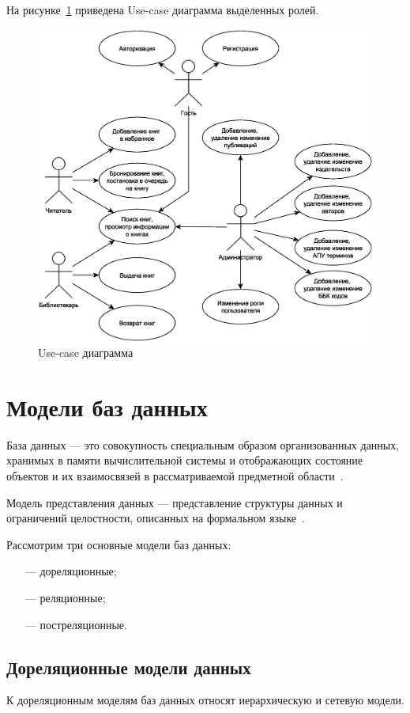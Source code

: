 На рисунке~\ref{fig:use-case} приведена Use-case диаграмма выделенных ролей.
\begin{figure}[H]
	\centering
	\includegraphics[scale=0.6]{img/use-case.eps}
	\caption{Use-case диаграмма}
	\label{fig:use-case}
\end{figure}

\section{Модели баз данных}
База данных --- это совокупность специальным образом организованных данных, хранимых в памяти вычислительной системы и отображающих состояние объектов и их взаимосвязей в рассматриваемой предметной области~\cite{DB}.

Модель представления данных --- представление структуры данных и ограничений целостности, описанных на формальном языке~\cite{Data_model}.

Рассмотрим три основные модели баз данных:

\begin{itemize}
	\item[---] дореляционные;
	\item[---] реляционные;
	\item[---] постреляционные.
\end{itemize}

\subsection*{Дореляционные модели данных}
К дореляционным моделям баз данных относят иерархическую и сетевую модели.

